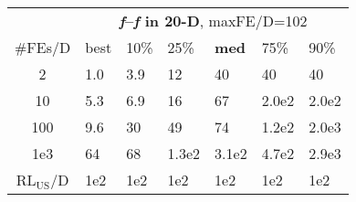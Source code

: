 \begin{tabular}{c|llllll}
 & \multicolumn{6}{|c}{\textbf{\textit{f}\raisebox{-0.35ex}{1}--\textit{f}\raisebox{-0.35ex}{24} in 20-D}, maxFE/D=102}\\
\#FEs/D & best & 10\% & 25\% & \textbf{med} & 75\% & 90\%\\
2 & \hspace*{1ex}1.0 & \hspace*{1ex}3.9 & 12 & 40 & 40 & 40\\
10 & \hspace*{1ex}5.3 & \hspace*{1ex}6.9 & 16 & 67 & 2.0e2 & 2.0e2\\
100 & \hspace*{1ex}9.6 & 30 & 49 & 74 & 1.2e2 & 2.0e3\\
1e3 & 64 & 68 & 1.3e2 & 3.1e2 & 4.7e2 & 2.9e3\\
$\text{RL}_{\text{US}}$/D & 1e2 & 1e2 & 1e2 & 1e2 & 1e2 & 1e2
\end{tabular}

